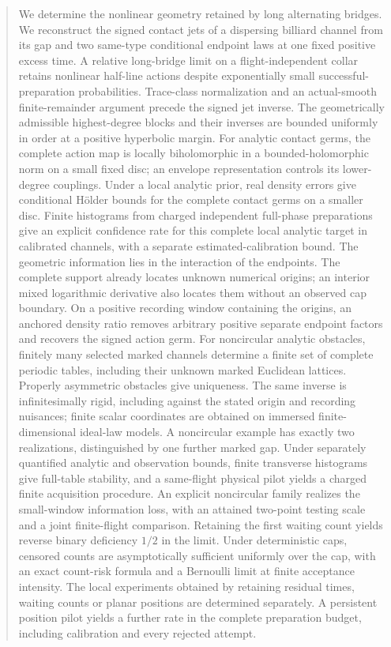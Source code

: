 \begin{abstract}
We determine the nonlinear geometry retained by long alternating bridges.
We reconstruct the signed contact jets of a dispersing billiard channel
from its gap and two same-type conditional endpoint laws at one fixed
positive excess time.  A relative long-bridge limit on a flight-independent
collar retains nonlinear half-line actions despite exponentially small
successful-preparation probabilities.  Trace-class normalization and an
actual-smooth finite-remainder argument precede the signed jet inverse.
The geometrically admissible highest-degree blocks and their inverses
are bounded uniformly in order at a positive hyperbolic margin.
For analytic contact germs, the complete action map is locally
biholomorphic in a bounded-holomorphic norm on a small fixed disc;
an envelope representation controls its lower-degree couplings.
Under a local analytic prior, real density errors give conditional
H\"older bounds for the complete contact germs on a smaller disc.
Finite histograms from charged independent full-phase preparations give
an explicit confidence rate for this complete local analytic target in
calibrated channels, with a separate estimated-calibration bound.
The geometric information lies in the interaction of the endpoints.
The complete support already locates unknown numerical origins; an interior
mixed logarithmic derivative also locates them without an observed cap
boundary.  On a positive recording window containing the origins, an
anchored density ratio removes arbitrary positive separate endpoint factors
and recovers the signed action germ.  For noncircular analytic obstacles, finitely
many selected marked channels determine a finite set of complete periodic
tables, including their unknown marked Euclidean lattices.  Properly
asymmetric obstacles give uniqueness.  The same inverse is infinitesimally
rigid, including against the stated origin and recording nuisances;
finite scalar coordinates are obtained on immersed finite-dimensional
ideal-law models.  A noncircular example has exactly two realizations,
distinguished by one further marked gap.  Under separately quantified
analytic and observation bounds, finite transverse histograms give
full-table stability, and a same-flight physical pilot yields a charged
finite acquisition procedure.  An explicit noncircular family realizes the small-window information
loss, with an attained two-point testing scale and a joint finite-flight
comparison.  Retaining the first waiting count yields reverse binary deficiency
$1/2$ in the limit.  Under deterministic caps, censored counts are
asymptotically sufficient uniformly over the cap, with an exact count-risk
formula and a Bernoulli limit at finite acceptance intensity.
The local experiments obtained by retaining
residual times, waiting counts or planar positions are determined separately.
A persistent position pilot yields a further rate in the complete
preparation budget, including calibration and every rejected attempt.
\end{abstract}
